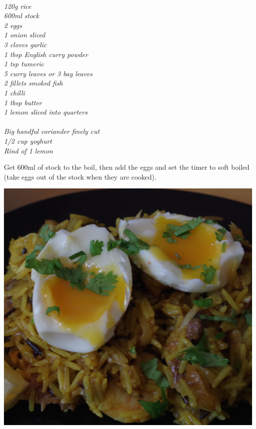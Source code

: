 \documentclass{tufte-book}
\begin{document}
\smallskip
{}
\\\emph{120g rice
\\600ml stock
\\2 eggs
\\1 onion sliced
\\3 cloves garlic
\\1 tbsp English curry powder
\\1 tsp tumeric
\\5 curry leaves or 3 bay leaves
\\2 fillets smoked fish
\\1 chilli
\\1 tbsp butter
\\1 lemon sliced into quarters
}
\\
\\\emph{Big handful coriander finely cut
\\1/2 cup yoghurt
\\Rind of 1 lemon
}

\smallskip
Get 600ml of stock to the boil, then add the eggs and set the timer to soft boiled (take eggs out of the stock when they are cooked).

\begin{marginfigure}%
  \includegraphics[width=\linewidth]{kedgeree.png}
\end{marginfigure}
\end{document}
